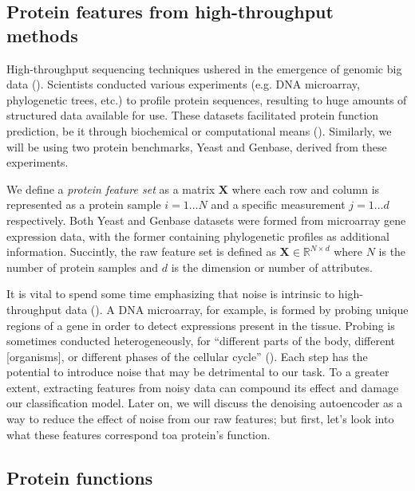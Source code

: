 \subsection{Protein features from high-throughput methods}

\par High-throughput sequencing techniques ushered in the emergence of
genomic big data (\cite{reuter2015high}). Scientists conducted various
experiments (e.g. DNA microarray, phylogenetic trees, etc.) to profile
protein sequences, resulting to huge amounts of structured data available for
use. These datasets facilitated protein function prediction, be it through
biochemical or computational means (\cite{eisenberg2000protein,
marcotte1999combined}). Similarly, we will be using two protein benchmarks, Yeast and
Genbase, derived from these experiments.

\par We define a \textit{protein feature set} as a matrix $\mathbf{X}$ where
each row and column is represented as a protein sample $i=1\dots N$ and a
specific measurement $j=1\dots d$ respectively. Both Yeast and Genbase
datasets were formed from microarray gene expression data, with the former
containing phylogenetic profiles as additional information. Succintly, the
raw feature set is defined as $\mathbf{X} \in \mathbb{R}^{N \times d}$ where $N$
is the number of protein samples and $d$ is the dimension or number of
attributes.

\par It is vital to spend some time emphasizing that noise is intrinsic to
high-throughput data (\cite{hong2013estimating}). A DNA microarray, for
example, is formed by probing unique regions of a gene in order to detect
expressions present in the tissue. Probing is sometimes conducted
heterogeneously, for ``different parts of the body, different [organisms], or
different phases of the cellular cycle'' (\cite{nguyen2009noise}). Each step
has the potential to introduce noise that may be detrimental to our task. To
a greater extent, extracting features from noisy data can compound its effect
and damage our classification model. Later on, we will discuss the denoising
autoencoder as a way to reduce the effect of noise from our raw features; but
first, let's look into what these features correspond to\textemdash a
protein's function.

\subsection{Protein functions}

